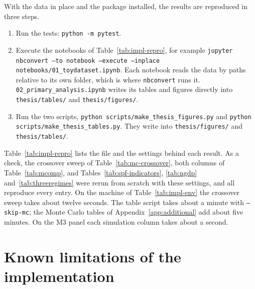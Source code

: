 \begin{appendix}
With the data in place and the package installed, the results are reproduced in three
steps.
\begin{enumerate}[nosep,leftmargin=*]
  \item Run the tests: \texttt{python -m pytest}.
  \item Execute the notebooks of Table~\ref{tab:impl-repro}, for example
    \texttt{jupyter nbconvert --to notebook --execute --inplace
    notebooks/01\_toydataset.ipynb}. Each notebook reads the data by paths relative
    to its own folder, which is where \texttt{nbconvert} runs it.
    \texttt{02\_primary\_analysis.ipynb} writes its tables and figures directly into
    \texttt{thesis/tables/} and \texttt{thesis/figures/}.
  \item Run the two scripts, \texttt{python scripts/make\_thesis\_figures.py} and
    \texttt{python scripts/make\_thesis\_tables.py}. They write into
    \texttt{thesis/figures/} and \texttt{thesis/tables/}.
\end{enumerate}
Table~\ref{tab:impl-repro} lists the file and the settings behind each result. As a
check, the crossover sweep of Table~\ref{tab:mc-crossover}, both columns of
Table~\ref{tab:mcomp}, and Tables~\ref{tab:spf-indicators}, \ref{tab:ngdp}
and~\ref{tab:threeregimes} were rerun from scratch with these settings, and all
reproduce every entry. On the machine of Table~\ref{tab:impl-env} the crossover sweep
takes about twelve seconds. The table script takes about a minute with
\texttt{--skip-mc}; the Monte Carlo tables of Appendix~\ref{app:additional} add about
five minutes. On the M3 panel each simulation column takes about a second.

\tabImplRepro

\section{Known limitations of the implementation}
\label{app:impl-limits}


\end{appendix}

